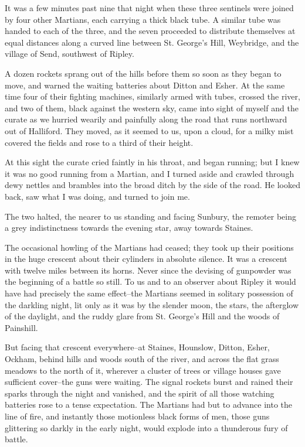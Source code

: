 It was a few minutes past nine that night when these three
sentinels were joined by four other Martians, each carrying a thick
black tube. A similar tube was handed to each of the three, and the
seven proceeded to distribute themselves at equal distances along a
curved line between St. George's Hill, Weybridge, and the village
of Send, southwest of Ripley.

A dozen rockets sprang out of the hills before them so soon as they
began to move, and warned the waiting batteries about Ditton and
Esher. At the same time four of their fighting machines, similarly
armed with tubes, crossed the river, and two of them, black against
the western sky, came into sight of myself and the curate as we
hurried wearily and painfully along the road that runs northward
out of Halliford. They moved, as it seemed to us, upon a cloud, for
a milky mist covered the fields and rose to a third of their
height.

At this sight the curate cried faintly in his throat, and began
running; but I knew it was no good running from a Martian, and I
turned aside and crawled through dewy nettles and brambles into the
broad ditch by the side of the road. He looked back, saw what I was
doing, and turned to join me.

The two halted, the nearer to us standing and facing Sunbury, the
remoter being a grey indistinctness towards the evening star, away
towards Staines.

The occasional howling of the Martians had ceased; they took up
their positions in the huge crescent about their cylinders in
absolute silence. It was a crescent with twelve miles between its
horns. Never since the devising of gunpowder was the beginning of a
battle so still. To us and to an observer about Ripley it would
have had precisely the same effect--the Martians seemed in solitary
possession of the darkling night, lit only as it was by the slender
moon, the stars, the afterglow of the daylight, and the ruddy glare
from St. George's Hill and the woods of Painshill.

But facing that crescent everywhere--at Staines, Hounslow, Ditton,
Esher, Ockham, behind hills and woods south of the river, and
across the flat grass meadows to the north of it, wherever a
cluster of trees or village houses gave sufficient cover--the guns
were waiting. The signal rockets burst and rained their sparks
through the night and vanished, and the spirit of all those
watching batteries rose to a tense expectation. The Martians had
but to advance into the line of fire, and instantly those
motionless black forms of men, those guns glittering so darkly in
the early night, would explode into a thunderous fury of battle.

